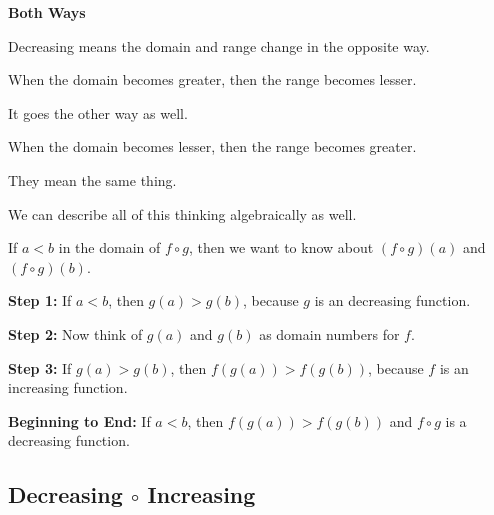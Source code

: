 \documentclass{ximera}
\begin{document}
\begin{warning} \textbf{\textcolor{red!70!black}{Both Ways}}

Decreasing means the domain and range change in the opposite way.

When the domain becomes greater, then the range becomes lesser.

It goes the other way as well.

When the domain becomes lesser, then the range becomes greater.

They mean the same thing.


\end{warning}






We can describe all of this thinking algebraically as well. 


If $a < b$ in the domain of $f \circ g$, then we want to know about $(f \circ g)(a)$  and $(f \circ g)(b)$.



\textbf{Step 1:}  If $a < b$, then $g(a) > g(b)$, because $g$ is an decreasing function.


\textbf{Step 2:}  Now think of $g(a)$  and $g(b)$ as domain numbers for $f$.


\textbf{Step 3:}  If $g(a) > g(b)$, then $f(g(a)) > f(g(b))$, because $f$ is an increasing function.


\textbf{Beginning to End:} If $a < b$, then $f(g(a)) > f(g(b))$ and $f \circ g$ is a decreasing function.






































\subsection*{Decreasing $\circ$ Increasing}
\end{document}
